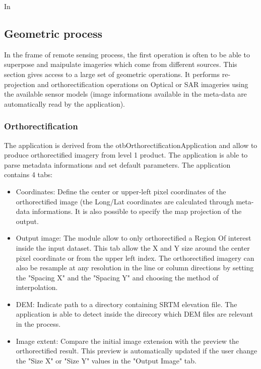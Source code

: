In 

\subsection{Geometric process}
In the frame of remote sensing process, the first operation is often to be able to superpose and maipulate imageries which 
come from different sources.
This section gives access to a large set of geometric operations.
It performs re-projection and orthorectification operations on Optical or SAR imageries using the available sensor models 
(image informations available in the meta-data are automatically read by the application).  
\subsubsection{Orthorectification}
The application is derived from the otbOrthorectificationApplication and allow to produce orthorectified imagery from level 1 
product.
The application is able to parse metadata informations and set default parameters. The application contains 4 tabs:

\begin{itemize}
\item Coordinates: Define the center or upper-left pixel coordinates of the orthorectified image (the Long/Lat coordinates are 
calculated through meta-data informations. It is also possible to specify the map projection of the output.
\item Output image: The module allow to only orthorectified a Region Of interest inside the input dataset. This tab allow the X and Y size 
around the center pixel coordinate or from the upper left index. The orthorectified imagery can also be resample at any resolution in the
line or column directions by setting the "Spacing X" and the "Spacing Y" and choosing the method of interpolation.
\item DEM: Indicate path to a directory containing SRTM elevation file. The application is able to detect inside the direcory which 
DEM files are relevant in the process.
\item Image extent: Compare the initial image extension with the preview the orthorectified result. This preview is automatically 
updated if the user change the "Size X" or "Size Y" values in the "Output Image" tab.   
\end{itemize}

